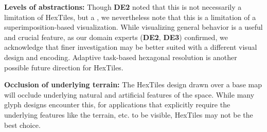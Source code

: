 \noindent
\textbf{Levels of abstractions: }
Though \textbf{DE2} noted that this is not necessarily a limitation of HexTiles, but a , we nevertheless note that this is a limitation of a superimposition-based visualization.
%
While visualizing general behavior is a useful and crucial feature, as our domain experts (\textbf{DE2}, \textbf{DE3}) confirmed, we acknowledge that finer investigation may be better suited with a different visual design and encoding.
%
Adaptive task-based hexagonal resolution is another possible future direction for HexTiles.

\noindent
\textbf{Occlusion of underlying terrain: }
The HexTiles design drawn over a base map will occlude underlying natural and artificial features of the space.
%
While many glyph designs encounter this, for applications that explicitly require the underlying features like the terrain, etc. to be visible, HexTiles may not be the best choice.

